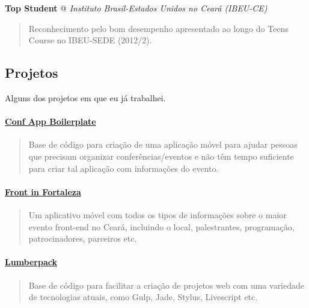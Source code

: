 \documentclass[]{article}
\let\oldparagraph\paragraph
\renewcommand{\paragraph}[1]{\oldparagraph{#1}\mbox{}}
\begin{document}
\textbf{Top Student} @ \emph{Instituto Brasil-Estados Unidos no Ceará
(IBEU-CE)}

\begin{quote}
Reconhecimento pelo bom desempenho apresentado ao longo do Teens Course
no IBEU-SEDE (2012/2).
\end{quote}

\subsection{Projetos}\label{projetos}

Alguns dos projetos em que eu já trabalhei.

\paragraph{\texorpdfstring{\href{https://github.com/devevents/conf-app-boilerplate}{Conf
App Boilerplate}}{Conf App Boilerplate}}\label{conf-app-boilerplate}

\begin{quote}
Base de código para criação de uma aplicação móvel para ajudar pessoas
que precisam organizar conferências/eventos e não têm tempo suficiente
para criar tal aplicação com informações do evento.
\end{quote}

\paragraph{\texorpdfstring{\href{https://play.google.com/store/apps/details?id=com.devevents.frontinfortaleza}{Front
in Fortaleza}}{Front in Fortaleza}}\label{front-in-fortaleza}

\begin{quote}
Um aplicativo móvel com todos os tipos de informações sobre o maior
evento front-end no Ceará, incluindo o local, palestrantes, programação,
patrocinadores, parceiros etc.
\end{quote}

\paragraph{\texorpdfstring{\href{https://github.com/mabrasil/lumberpack}{Lumberpack}}{Lumberpack}}\label{lumberpack}

\begin{quote}
Base de código para facilitar a criação de projetos web com uma
variedade de tecnologias atuais, como Gulp, Jade, Stylus, Livescript
etc.
\end{quote}
\end{document}
